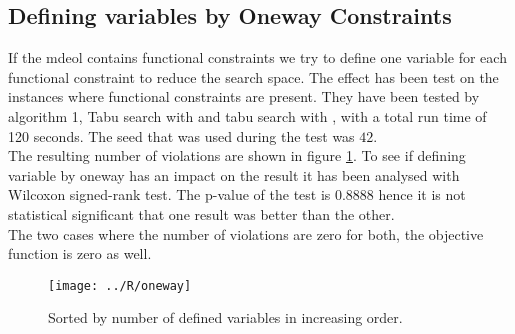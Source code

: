 \subsection{Defining variables by Oneway Constraints}
If the mdeol contains functional constraints we try to define one variable for each functional constraint to reduce the 
search space. The effect has been test on the instances where functional constraints are present. They have been tested 
by algorithm 1, Tabu search with  and tabu search with , with a 
total run time of 120 seconds. The seed that was used during the test was $42$. \\ 
The resulting number of violations are shown in figure \ref{fig_onewaytest}. To see if defining variable 
by oneway has an impact on the result it has been analysed with Wilcoxon signed-rank test. The p-value of the test is 
0.8888 hence it is not statistical significant that one result was better than the other. \\ 
The two cases where the number of violations are zero for both, the objective function is zero as well. 
\begin{figure}[!h]
\centering
\texttt{[image: ../R/oneway]} \caption{Sorted by number of defined variables in 
increasing order.}\label{fig_onewaytest}
\end{figure}\noindent
\

